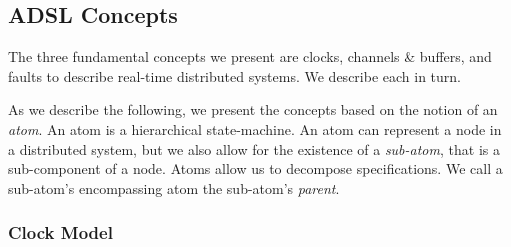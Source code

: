 



\subsection{ADSL Concepts}
\label{subsec:ADSL_Elements}

The three fundamental concepts we present are clocks, channels \& buffers, and faults to describe real-time distributed systems. We describe each in turn.

As we describe the following, we present the concepts based on the notion of an \emph{atom}. An atom is a hierarchical state-machine. An atom can represent a node in a distributed system, but we also allow for the existence of a \emph{sub-atom}, that is a sub-component of a node. Atoms allow us to decompose specifications. We call a sub-atom's encompassing atom the sub-atom's \emph{parent}.

\subsubsection{Clock Model}
\label{subsubsec:clock_model}

